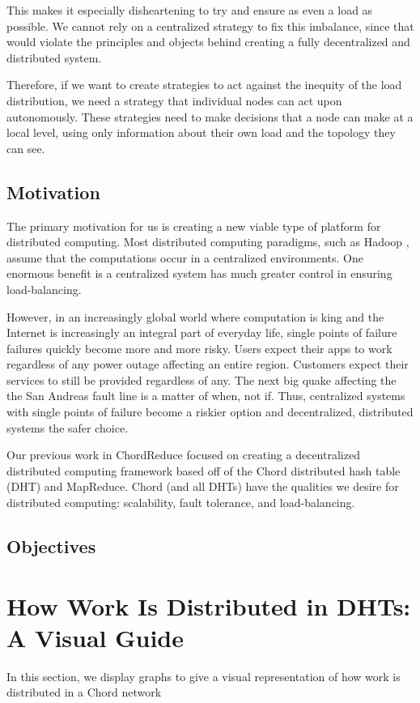 This makes it especially disheartening to try and ensure as even a load as possible.
We cannot rely on a centralized strategy to fix this imbalance, since that would violate the principles and objects behind creating a fully decentralized and distributed system.

Therefore, if we want to create strategies to act against the inequity of the load distribution, we need a strategy that individual nodes can act upon autonomously.
These strategies need to make decisions that a node can make at a local level, using only information about their own load and the topology they can see.


\subsection{Motivation}
The primary motivation for us is creating a new viable type of platform for distributed computing.
Most distributed computing paradigms, such as Hadoop \cite{hadoop}, assume that the computations occur in a centralized environments.
One enormous benefit is a centralized system has much greater control in ensuring load-balancing.

However, in an increasingly global world where computation is king and the Internet is increasingly an integral part of everyday life, single points of failure failures quickly become more and more risky.
Users expect their apps to work regardless of any power outage affecting an entire region.
Customers expect their services to still be provided regardless of any.
The next big quake affecting the the San Andreas fault line is a matter of when, not if.
Thus, centralized systems with single points of failure become a riskier option and decentralized, distributed systems the safer choice.


Our previous work in ChordReduce \cite{chordreduce} focused on creating a decentralized distributed computing framework based off of the Chord distributed hash table (DHT) and MapReduce.
Chord (and all DHTs) have the qualities we desire for distributed computing: scalability, fault tolerance, and load-balancing.


\subsection{Objectives}


\section{How Work Is Distributed in DHTs: A Visual Guide}
In this section, we display graphs to give a visual representation of how work is distributed in a Chord \cite{chord} network

